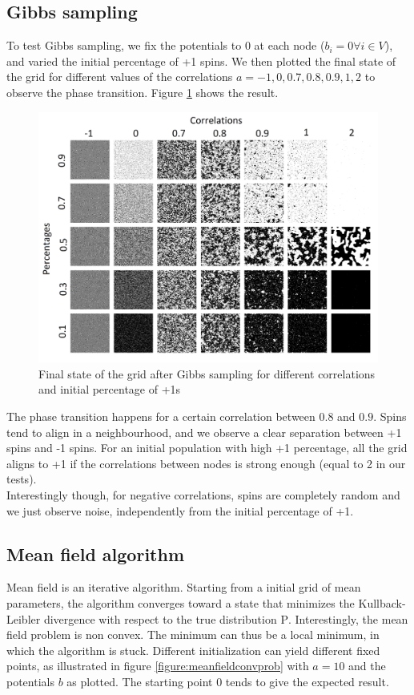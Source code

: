\documentclass[a4paper]{article}
\begin{document}
    \subsection{Gibbs sampling}
    To test Gibbs sampling, we fix the potentials to 0 at each node ($b_i = 0 \forall i \in V$), and varied the initial percentage of +1 spins. We then plotted the final state of the grid for different values of the correlations $a = {-1, 0, 0.7, 0.8, 0.9, 1, 2}$ to observe the phase transition. Figure \ref{figure:gibbs} shows the result.
    
    \begin{figure}[h]
        \centering
        \includegraphics[scale=0.18]{gibbs_sampling}

        \caption{Final state of the grid after Gibbs sampling for different correlations and initial percentage of +1s}
        \label{figure:gibbs}
    \end{figure}
    
    The phase transition happens for a certain correlation between $0.8$ and $0.9$. Spins tend to align in a neighbourhood, and we observe a clear separation between +1 spins and -1 spins. For an initial population with high +1 percentage, all the grid aligns to +1 if the correlations between nodes is strong enough (equal to 2 in our tests).
    \\
    Interestingly though, for negative correlations, spins are completely random and we just observe noise, independently from the initial percentage of +1.
    
    \subsection{Mean field algorithm}
    Mean field is an iterative algorithm. Starting from a initial grid of mean parameters, the algorithm converges toward a state that minimizes the Kullback-Leibler divergence with respect to the true distribution $\mathrm{P}$.
    Interestingly, the mean field problem is non convex. The minimum can thus be a local minimum, in which the algorithm is stuck. Different initialization can yield different fixed points, as illustrated in figure \ref{figure:meanfieldconvprob} with $a=10$ and the potentials $b$ as plotted. The starting point 0 tends to give the expected result.
    
\end{document}
